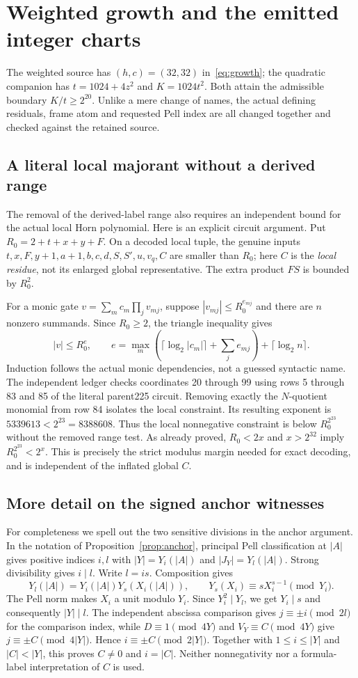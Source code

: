 \section{Weighted growth and the emitted integer charts}
\label{sec:signed22}
The weighted source has $(h,c)=(32,32)$ in~\eqref{eq:growth}; the
quadratic companion has $t=1024+4z^2$ and $K=1024t^2$.
Both attain the admissible boundary $K/t\ge2^{20}$. Unlike a mere
change of names, the actual defining residuals, frame atom and requested
Pell index are all changed together and checked against the retained source.

\subsection{A literal local majorant without a derived range}
The removal of the derived-label range also requires an independent bound
for the actual local Horn polynomial. Here is an explicit circuit argument.
Put $R_0=2+t+x+y+F$. On a decoded local tuple, the genuine inputs
$t,x,F,y+1,a+1,b,c,d,S,S',u,v_q,C$ are smaller than $R_0$; here $C$
is the \emph{local residue}, not its enlarged global representative.
The extra product $FS$ is bounded by $R_0^2$.

For a monic gate $v=\sum_m c_m\prod_jv_{mj}$, suppose
$|v_{mj}|\le R_0^{e_{mj}}$ and there are $n$ nonzero summands.
Since $R_0\ge2$, the triangle inequality gives
\[
 |v|\le R_0^e,\qquad
 e=\max_m\left(\lceil\log_2|c_m|\rceil+\sum_je_{mj}\right)
       +\lceil\log_2n\rceil.
\]
Induction follows the actual monic dependencies, not a guessed syntactic
name. The independent ledger checks coordinates 20 through 99 using
rows 5 through 83 and 85 of the literal parent225 circuit. Removing exactly
the $N$-quotient monomial from row 84 isolates the local constraint.
Its resulting exponent is $5339613<2^{23}=8388608$. Thus the local
nonnegative constraint is below $R_0^{2^{23}}$ without the removed
range test. As already proved, $R_0<2x$ and $x>2^{32}$ imply
$R_0^{2^{23}}<2^x$. This is precisely the strict modulus margin needed
for exact decoding, and is independent of the inflated global $C$.

\subsection{More detail on the signed anchor witnesses}
For completeness we spell out the two sensitive divisions in the anchor
argument. In the notation of Proposition~\ref{prop:anchor}, principal
Pell classification at $|A|$ gives positive indices $i,l$ with
$|Y|=Y_i(|A|)$ and $|J_Y|=Y_l(|A|)$. Strong divisibility gives $i\mid l$.
Write $l=is$. Composition gives
\[
 Y_l(|A|)=Y_i(|A|)Y_s(X_i(|A|)),\qquad
 Y_s(X_i)\equiv sX_i^{s-1}\pmod{Y_i}.
\]
The Pell norm makes $X_i$ a unit modulo $Y_i$. Since $Y_i^2\mid Y_l$,
we get $Y_i\mid s$ and consequently $|Y|\mid l$. The independent
abscissa comparison gives $j\equiv\pm i\pmod{2l}$ for the comparison
index, while $D\equiv1\pmod{4Y}$ and $V_Y\equiv C\pmod{4Y}$ give
$j\equiv\pm C\pmod{4|Y|}$. Hence
$i\equiv\pm C\pmod{2|Y|}$. Together with
$1\le i\le|Y|$ and $|C|<|Y|$, this proves $C\ne0$ and $i=|C|$.
Neither nonnegativity nor a formula-label interpretation of $C$ is used.

